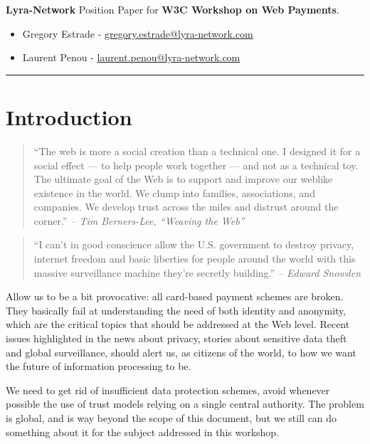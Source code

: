 \textbf{Lyra-Network} Position Paper for \textbf{W3C Workshop on Web
Payments}.

\begin{itemize}
\item
  Gregory Estrade -
  \href{mailto:gregory.estrade@lyra-network.com}{gregory.estrade@lyra-network.com}
\item
  Laurent Penou -
  \href{mailto:laurent.penou@lyra-network.com}{laurent.penou@lyra-network.com}
\end{itemize}

\begin{center}\rule{3in}{0.4pt}\end{center}

\section{Introduction}\label{introduction}

\begin{quote}
``The web is more a social creation than a technical one. I designed it
for a social effect --- to help people work together --- and not as a
technical toy. The ultimate goal of the Web is to support and improve
our weblike existence in the world. We clump into families,
associations, and companies. We develop trust across the miles and
distrust around the corner.'' \emph{-- Tim Berners-Lee, ``Weaving the
Web''}
\end{quote}

\begin{quote}
``I can't in good conscience allow the U.S. government to destroy
privacy, internet freedom and basic liberties for people around the
world with this massive surveillance machine they're secretly
building.'' \emph{-- Edward Snowden}
\end{quote}

Allow us to be a bit provocative: all card-based payment schemes are
broken. They basically fail at understanding the need of both identity
and anonymity, which are the critical topics that should be addressed at
the Web level. Recent issues highlighted in the news about privacy,
stories about sensitive data theft and global surveillance, should alert
us, as citizens of the world, to how we want the future of information
processing to be.

We need to get rid of insufficient data protection schemes, avoid
whenever possible the use of trust models relying on a single central
authority. The problem is global, and is way beyond the scope of this
document, but we still can do something about it for the subject
addressed in this workshop.


